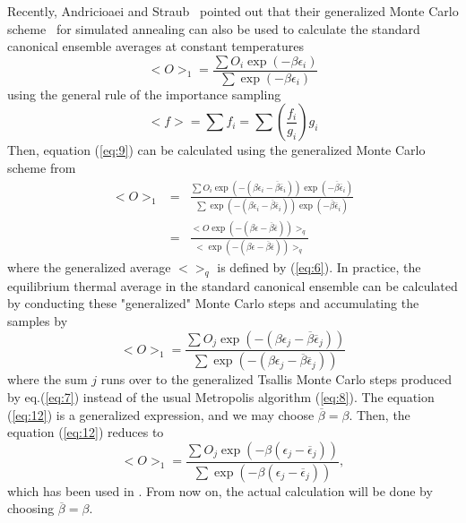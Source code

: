 Recently, Andricioaei and Straub~\cite{AS2,AS3} pointed out that their 
generalized Monte Carlo scheme~\cite{AS1} for simulated annealing can 
also be used to calculate the standard canonical ensemble averages at 
constant temperatures
\begin{equation}
<O>_{1}=\frac{\sum O_{i}\exp(-\beta \epsilon_{i})}
{\sum \exp(-\beta \epsilon_{i})}
\label{eq:9}
\end{equation}
using the general rule of the importance sampling~\cite{VW}
\begin{equation}
<f>=\sum f_{i}=\sum \left(\frac{f_{i}}{g_{i}}\right)g_{i}
\label{eq:8b}
\end{equation}
Then, equation (\ref{eq:9}) can be calculated using the generalized
Monte Carlo scheme from
\begin{eqnarray}
<O>_{1}&=&\frac{ \sum
O_{i}\exp\left(-\left(\beta\epsilon_{i}-\overline{\beta}
\overline{\epsilon}_{i}
\right)\right)\exp\left(-\overline{\beta}
\overline{\epsilon}_{i}\right) }{\sum
\exp\left(-\left(\beta\epsilon_{i}-\overline{\beta}
\overline{\epsilon}_{i}\right) 
\right)\exp(-\overline{\beta}\overline{\epsilon}_{i})} 
\label{eq:10}\\
&=& \frac{< O \exp\left(-\left(\beta\epsilon-
\overline{\beta}\overline{\epsilon} 
\right)\right)>_{q}}{<\exp\left(-\left(\beta\epsilon-
\overline{\beta}\overline{\epsilon}\right)\right)>_{q}}
\label{eq:11}
\end{eqnarray}
where the generalized average $<>_{q}$ is defined by (\ref{eq:6}). 
In practice, the equilibrium thermal average in the standard 
canonical ensemble can be calculated by conducting these 
"generalized" Monte Carlo steps and accumulating the samples by
\begin{equation}
<O>_{1}=\frac{\sum O_{j} \exp\left(-\left(\beta\epsilon_{j}- 
\overline{\beta}\overline{\epsilon}_{j}\right)\right)}
{\sum \exp\left(-\left(\beta\epsilon_{j}-
\overline{\beta}\overline{\epsilon}_{j}\right)\right)}
\label{eq:12}
\end{equation}
where the sum $j$ runs over to the generalized Tsallis Monte 
Carlo steps produced by eq.(\ref{eq:7}) instead of the usual 
Metropolis algorithm (\ref{eq:8}). The equation (\ref{eq:12}) 
is a generalized expression, and we may choose 
$\overline{\beta}=\beta$.  Then, the equation (\ref{eq:12}) 
reduces to
\begin{equation}
<O>_{1}=\frac{\sum O_{j} \exp\left(-\beta\left(\epsilon_{j}- 
\overline{\epsilon}_{j}\right)\right)}
{\sum \exp\left(-\beta\left(\epsilon_{j}-
\overline{\epsilon}_{j}\right)\right)},
\label{eq:12x}
\end{equation}
which has been used in \cite{AS2,AS3}.  From now on, the actual 
calculation will be done by choosing $\overline{\beta}=\beta$.

